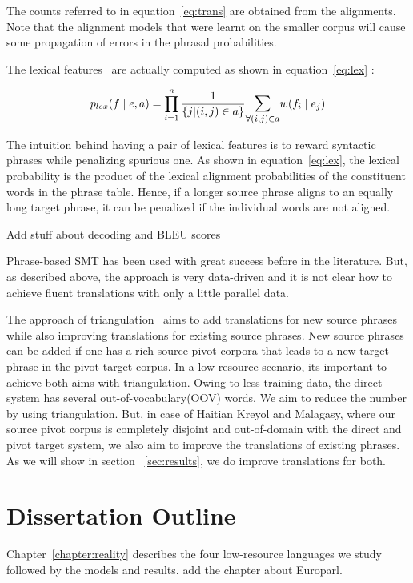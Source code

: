 The counts referred to in equation~\eqref{eq:trans} are obtained from the alignments. Note that the alignment models that were learnt on the smaller corpus will cause some propagation of errors in the phrasal probabilities. 

 The lexical features~\cite{Koehn:03} are actually computed as shown in equation~\eqref{eq:lex} : 

\begin{equation} \label{eq:lex}
	p_{lex}(f \mid e, a) = \prod\limits_{i=1}^{n} \frac{1}{\{j | (i,j) \in a\}}
	\mathlarger{\sum\limits_{\forall (i,j) \in a}} w(f_{i} \mid e_{j})
\end{equation}


The intuition behind having a pair of lexical features is to reward syntactic phrases while penalizing spurious one. As shown in equation~\eqref{eq:lex}, the lexical probability is the product of the lexical alignment probabilities of the constituent words in the phrase table. Hence, if a longer source phrase aligns to an equally long target phrase, it can be penalized if the individual words are not aligned. 

\alert{Add stuff about decoding and BLEU scores}

Phrase-based SMT has been used with great success before in the literature. But, as described above, the approach is very data-driven and it is not clear how to achieve fluent translations with only a little parallel data. 


The approach of triangulation~\cite{Cohn:07,Utiyama:07,Nakov:12} aims to add translations for new source phrases while also improving translations for existing source phrases. New source phrases can be added if one has a rich source pivot corpora that leads to a new target phrase in the pivot target corpus. In a low resource scenario, its important to achieve both aims with triangulation. Owing to less training data, the direct system has several out-of-vocabulary(OOV) words. We aim to reduce the number by using triangulation. But, in case of Haitian Kreyol and Malagasy, where our source pivot corpus is completely disjoint and out-of-domain with the direct and pivot target system, we also aim to improve the translations of existing phrases. As we will show in section ~\ref{sec:results}, we do improve translations for both.  


\section{Dissertation Outline}
\label{sec:outline}
Chapter~\ref{chapter:reality} describes the four low-resource languages we study followed by the models and results. \alert{add the chapter about Europarl}.


